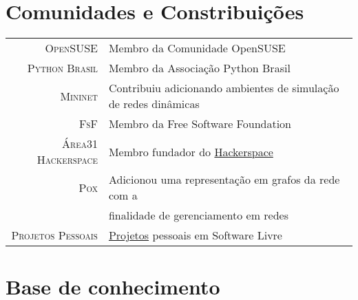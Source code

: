 \documentclass[a4paper,10pt]{article} %
\begin{document}
\section{Comunidades e Constribuições}

\begin{tabular}{rl}
\textsc{OpenSUSE}  & Membro da Comunidade OpenSUSE \\
\textsc{Python Brasil}  & Membro da Associação Python Brasil \\
\textsc{Mininet}  & Contribuiu adicionando ambientes de simulação de redes
dinâmicas \\
\textsc{FsF} & Membro da Free Software Foundation \\
\textsc{Área31 Hackerspace} & Membro fundador do
\href{http://area31.net.br}{Hackerspace} \\
\textsc{Pox} & Adicionou uma representação em grafos da rede com a
\\ & finalidade de gerenciamento em redes \\
\textsc{Projetos Pessoais} & \href{http://github.com/pantuza}{Projetos}
pessoais em Software Livre \\
\end{tabular}













\section{Base de conhecimento}
\end{document}
